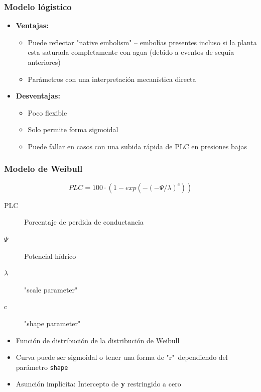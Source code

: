 \documentclass[usepdftitle=false]{beamer}
\newcommand{\Blue}[1]{{\color{blue!50!black}\textbf{#1}}}
\begin{document}
\begin{frame}
\frametitle{Modelo lógistico}
\begin{itemize}
\item<1-> \Blue{Ventajas:}
\begin{itemize}
	\item Puede reflectar "native embolism" -- embolías presentes incluso si la planta esta saturada completamente con agua (debido a eventos de sequía anteriores)
   \item Parámetros con una interpretación mecanística directa
\end{itemize}
\item<2> \Blue{Desventajas:}	
\begin{itemize}
  \item Poco flexible
  \item Solo permite forma sigmoidal
   \item Puede fallar en casos con una subida rápida de PLC en presiones bajas
\end{itemize}
\end{itemize}	
\end{frame}
	



\begin{frame}
\frametitle{Modelo de Weibull}
\begin{equation*}
PLC = 100\cdot (1-exp(-( -\Psi/\lambda)^c))
\end{equation*}
\begin{description}
  \item[PLC] Porcentaje de perdida de conductancia
  \item[$\Psi$] Potencial hídrico
  \item[$\lambda$]  "{}scale parameter"\
  \item[c] "{}shape parameter"\
\end{description}
		\begin{itemize}
            \item<2-> Función de distribución de la distribución de Weibull
			\item<3-> Curva puede ser sigmoidal o tener una forma de "{}r"\ dependiendo del parámetro \texttt{shape}
			\item<4->  Asunción implícita: Intercepto de \textbf{y} restringido a cero
			\end{itemize}	
	\end{frame}	
\end{document}
